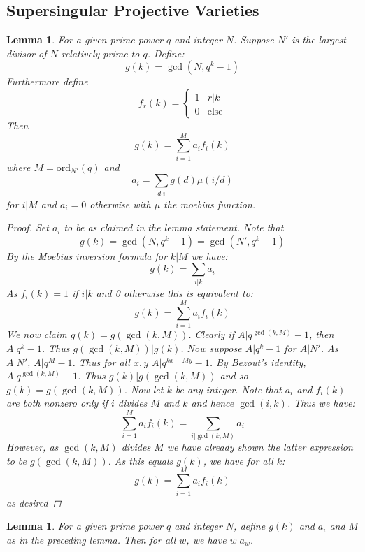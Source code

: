 \documentclass{article}
\newcommand{\ord}[0]{\mathrm{ord}}
\newtheorem{lemma}[theorem]{Lemma}
\theoremstyle{definition}
\theoremstyle{definition}
\theoremstyle{remark}
\begin{document}
\subsection{Supersingular Projective Varieties}
\begin{lemma} 
\label{lem:gcd_sum}
For a given prime power $q$ and integer $N$. Suppose $N'$ is the largest divisor of $N$ relatively prime to $q$. Define:
\[g(k) = \gcd(N,q^k-1)\]
Furthermore define
\[f_r(k) = \begin{cases} 1 & r|k \\
0 & \text{else}
\end{cases}\]
Then 
\[g(k) = \sum_{i=1}^M a_if_i(k)\]
where $M = \ord_{N'}(q)$ and 
\[a_i = \sum_{d|i} g(d)\mu(i/d)\]
for $i | M$ and $a_i = 0$ otherwise with $\mu$ the moebius function.
\begin{proof}
Set $a_i$ to be as claimed in the lemma statement. Note that 
\[g(k) = \gcd(N,q^k-1) = \gcd(N',q^k-1)\]
By the Moebius inversion formula for $k | M$ we have:
\[g(k) = \sum_{i|k} a_i\]
As $f_i(k) = 1$ if $i|k$ and 0 otherwise this is equivalent to:
\[g(k) = \sum_{i=1}^M a_if_i(k)\]
We now claim $g(k) = g(\gcd(k,M))$. Clearly if $A | q^{\gcd(k,M)} - 1$, then $A | q^k - 1$. Thus $g(\gcd(k,M)) | g(k)$. Now suppose $A | q^k - 1$ for $A | N'$. As $A | N'$, $ A | q^M - 1$. Thus for all $x,y$ $A |q^{kx + My} - 1$. By Bezout's identity, $A | q^{\gcd(k,M)} - 1$. Thus $g(k) | g(\gcd(k,M))$ and so $g(k) = g(\gcd(k,M))$. Now let $k$ be any integer. Note that $a_i$ and $f_i(k)$ are both nonzero only if $i$ divides $M$ and $k$ and hence $\gcd(i,k)$. Thus we have:
\[\sum_{i=1}^M a_if_i(k) = \sum_{i | \gcd(k,M)} a_i\]
However, as $\gcd(k,M)$ divides $M$ we have already shown the latter expression to be $g(\gcd(k,M))$. As this equals $g(k)$, we have for all $k$: 
\[g(k) = \sum_{i=1}^M a_if_i(k)\]
as desired
\end{proof}
\end{lemma}
\begin{lemma}
\label{lem:a_w_div}
For a given prime power $q$ and integer $N$, define $g(k)$ and $a_i$ and $M$ as in the preceding lemma. Then for all $w$, we have $w | a_w$. 
\end{lemma}
\end{document}
